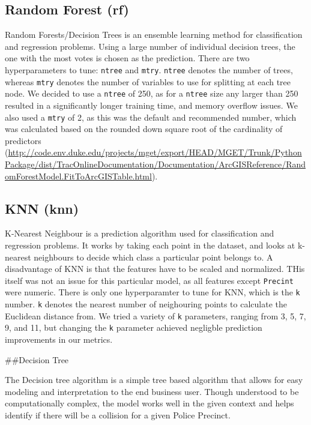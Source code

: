\hypertarget{random-forest-rf}{%
\subsection{Random Forest (rf)}\label{random-forest-rf}}

Random Forests/Decision Trees is an ensemble learning method for
classification and regression problems. Using a large number of
individual decision trees, the one with the most votes is chosen as the
prediction. There are two hyperparameters to tune: \texttt{ntree} and
\texttt{mtry}. \texttt{ntree} denotes the number of trees, whereas
\texttt{mtry} denotes the number of variables to use for splitting at
each tree node. We decided to use a \texttt{ntree} of 250, as for a
\texttt{ntree} size any larger than 250 resulted in a significantly
longer training time, and memory overflow issues. We also used a
\texttt{mtry} of 2, as this was the default and recommended number,
which was calculated based on the rounded down square root of the
cardinality of predictors
(\url{http://code.env.duke.edu/projects/mget/export/HEAD/MGET/Trunk/PythonPackage/dist/TracOnlineDocumentation/Documentation/ArcGISReference/RandomForestModel.FitToArcGISTable.html}).

\hypertarget{knn-knn}{%
\subsection{KNN (knn)}\label{knn-knn}}

K-Nearest Neighbour is a prediction algorithm used for classification
and regression problems. It works by taking each point in the dataset,
and looks at k-nearest neighbours to decide which class a particular
point belongs to. A disadvantage of KNN is that the features have to be
scaled and normalized. THis itself was not an issue for this particular
model, as all features except \texttt{Precint} were numeric. There is
only one hyperparamter to tune for KNN, which is the \texttt{k} number.
\texttt{k} denotes the nearest number of neighouring points to calculate
the Euclidean distance from. We tried a variety of \texttt{k}
parameters, ranging from 3, 5, 7, 9, and 11, but changing the \texttt{k}
parameter achieved negligble prediction improvements in our metrics.

\#\#Decision Tree

The Decision tree algorithm is a simple tree based algorithm that allows
for easy modeling and interpretation to the end business user. Though
understood to be computationally complex, the model works well in the
given context and helps identify if there will be a collision for a
given Police Precinct.

